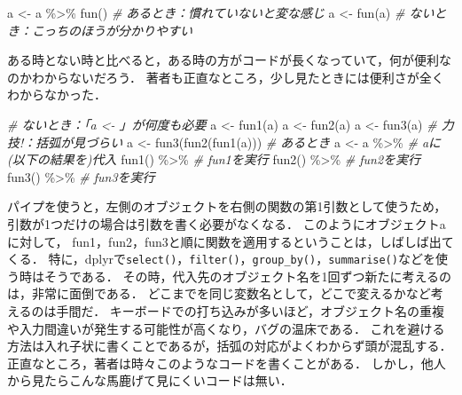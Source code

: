 \documentclass[
]{article}
\newenvironment{Shaded}{\begin{snugshade}}{\end{snugshade}}
\newcommand{\CommentTok}[1]{\textcolor[rgb]{0.56,0.35,0.01}{\textit{#1}}}
\newcommand{\FunctionTok}[1]{\textcolor[rgb]{0.00,0.00,0.00}{#1}}
\newcommand{\NormalTok}[1]{#1}
\newcommand{\OtherTok}[1]{\textcolor[rgb]{0.56,0.35,0.01}{#1}}
\newcommand{\SpecialCharTok}[1]{\textcolor[rgb]{0.00,0.00,0.00}{#1}}
\begin{document}
\begin{Shaded}
\begin{Highlighting}[]
\NormalTok{a }\OtherTok{\textless{}{-}}\NormalTok{ a }\SpecialCharTok{\%\textgreater{}\%} \FunctionTok{fun}\NormalTok{() }\CommentTok{\# あるとき：慣れていないと変な感じ}
\NormalTok{a }\OtherTok{\textless{}{-}} \FunctionTok{fun}\NormalTok{(a)      }\CommentTok{\# ないとき：こっちのほうが分かりやすい}
\end{Highlighting}
\end{Shaded}

ある時とない時と比べると，ある時の方がコードが長くなっていて，何が便利なのかわからないだろう．
著者も正直なところ，少し見たときには便利さが全くわからなかった．

\begin{Shaded}
\begin{Highlighting}[]
  \CommentTok{\# ないとき：「a \textless{}{-} 」が何度も必要}
\NormalTok{a }\OtherTok{\textless{}{-}} \FunctionTok{fun1}\NormalTok{(a)}
\NormalTok{a }\OtherTok{\textless{}{-}} \FunctionTok{fun2}\NormalTok{(a)}
\NormalTok{a }\OtherTok{\textless{}{-}} \FunctionTok{fun3}\NormalTok{(a)}
  \CommentTok{\# 力技!：括弧が見づらい}
\NormalTok{a }\OtherTok{\textless{}{-}} \FunctionTok{fun3}\NormalTok{(}\FunctionTok{fun2}\NormalTok{(}\FunctionTok{fun1}\NormalTok{(a)))}
  \CommentTok{\# あるとき}
\NormalTok{a }\OtherTok{\textless{}{-}}\NormalTok{ a }\SpecialCharTok{\%\textgreater{}\%}   \CommentTok{\# aに(以下の結果を)代入}
  \FunctionTok{fun1}\NormalTok{() }\SpecialCharTok{\%\textgreater{}\%} \CommentTok{\# fun1を実行}
  \FunctionTok{fun2}\NormalTok{() }\SpecialCharTok{\%\textgreater{}\%} \CommentTok{\# fun2を実行}
  \FunctionTok{fun3}\NormalTok{() }\SpecialCharTok{\%\textgreater{}\%} \CommentTok{\# fun3を実行}
\end{Highlighting}
\end{Shaded}

パイプを使うと，左側のオブジェクトを右側の関数の第1引数として使うため，引数が1つだけの場合は引数を書く必要がなくなる．
このようにオブジェクトaに対して， fun1，fun2，fun3と順に関数を適用するということは，しばしば出てくる．
特に，dplyrで\texttt{select()}，\texttt{filter()}，\texttt{group\_by()}，\texttt{summarise()}などを使う時はそうである．
その時，代入先のオブジェクト名を1回ずつ新たに考えるのは，非常に面倒である．
どこまでを同じ変数名として，どこで変えるかなど考えるのは手間だ．
キーボードでの打ち込みが多いほど，オブジェクト名の重複や入力間違いが発生する可能性が高くなり，バグの温床である．
これを避ける方法は入れ子状に書くことであるが，括弧の対応がよくわからず頭が混乱する．
正直なところ，著者は時々このようなコードを書くことがある．
しかし，他人から見たらこんな馬鹿げて見にくいコードは無い．
\end{document}

